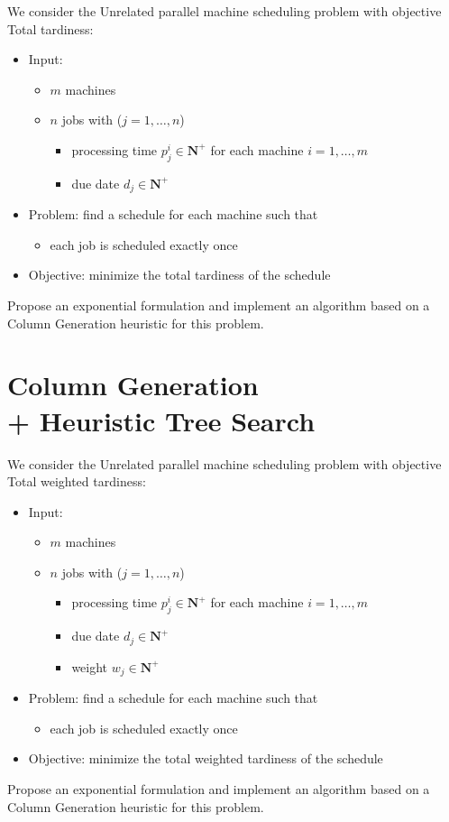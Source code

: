 \documentclass[a4paper,twocolumn]{article}
\newcommand{\N}{\mathbf{N}}
\begin{document}
We consider the Unrelated parallel machine scheduling problem with objective Total tardiness:
\begin{itemize}
  \item Input:
    \begin{itemize}
      \item $m$ machines
      \item $n$ jobs with ($j = 1, \dots, n$)
        \begin{itemize}
          \item processing time $p_j^i \in \N^+$ for each machine $i = 1, \dots, m$
          \item due date $d_j \in \N^+$
        \end{itemize}
    \end{itemize}
  \item Problem: find a schedule for each machine such that
    \begin{itemize}
      \item each job is scheduled exactly once
    \end{itemize}
  \item Objective: minimize the total tardiness of the schedule
\end{itemize}

Propose an exponential formulation and implement an algorithm based on a Column Generation heuristic for this problem.

\section{Column Generation \\ + Heuristic Tree Search}

We consider the Unrelated parallel machine scheduling problem with objective Total weighted tardiness:
\begin{itemize}
  \item Input:
    \begin{itemize}
      \item $m$ machines
      \item $n$ jobs with ($j = 1, \dots, n$)
        \begin{itemize}
          \item processing time $p_j^i \in \N^+$ for each machine $i = 1, \dots, m$
          \item due date $d_j \in \N^+$
          \item weight $w_j \in \N^+$
        \end{itemize}
    \end{itemize}
  \item Problem: find a schedule for each machine such that
    \begin{itemize}
      \item each job is scheduled exactly once
    \end{itemize}
  \item Objective: minimize the total weighted tardiness of the schedule
\end{itemize}

Propose an exponential formulation and implement an algorithm based on a Column Generation heuristic for this problem.
\end{document}
